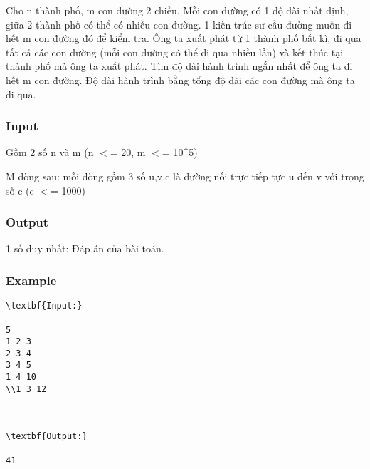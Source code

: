 

Cho n thành phố, m con đường 2 chiều. Mỗi con đường có 1 độ dài nhất định, giữa 2 thành phố có thể có nhiều con đường. 1 kiến trúc sư cầu đường muốn đi hết m con đường đó để kiểm tra. Ông ta xuất phát từ 1 thành phố bất kì, đi qua tất cả các con đường (mỗi con đường có thể đi qua nhiều lần) và kết thúc tại thành phố mà ông ta xuất phát. Tìm độ dài hành trình ngắn nhất để ông ta đi hết m con đường. Độ dài hành trình bằng tổng độ dài các con đường mà ông ta đi qua.

\subsubsection{Input}

Gồm 2 số n và m (n $<$= 20, m $<$= 10\textasciicircum5)

M dòng sau: mỗi dòng gồm 3 số u,v,c là đường nối trực tiếp tực u đến v với trọng số c (c $<$= 1000)

\subsubsection{Output}

1 số duy nhất: Đáp án của bài toán.

\subsubsection{Example}
\begin{verbatim}
\textbf{Input:}

5
1 2 3
2 3 4
3 4 5
1 4 10
\\1 3 12



\textbf{Output:}

41

\end{verbatim}
